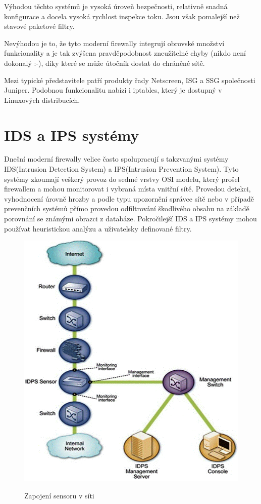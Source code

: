\documentclass[11pt,twoside,a4paper]{article}
\begin{document}
Výhodou těchto systémů je vysoká úroveň bezpečnosti, relativně snadná konfigurace a docela vysoká rychlost inspekce toku. Jsou však pomalejší než stavové paketové filtry.

Nevýhodou je to, že tyto moderní firewally integrují obrovské množství funkcionality a je tak zvýšena pravděpodobnost zneužitelné chyby (nikdo není dokonalý :-), díky které se může útočník dostat do chráněné sítě.

Mezi typické představitele patří produkty řady Netscreen, ISG a SSG společnosti Juniper. Podobnou funkcionalitu nabízi i iptables, který je dostupný v Linuxových distribucích. 

\section{IDS a IPS systémy}
Dnešní moderní firewally velice často spolupracují s takzvanými systémy IDS(Intrusion Detection System) a IPS(Intrusion Prevention System). Tyto systémy zkoumají veškerý provoz do sedmé vrstvy OSI modelu, který prošel firewallem a mohou monitorovat i vybraná místa vnitřní sítě. Provedou detekci, vyhodnocení úrovně hrozby a podle typu upozornění správce sítě nebo v případě prevenčních systémů přímo provedou odfiltrování škodlivého obsahu na základě porovnání se známými obrazci z databáze. Pokročilejší IDS a IPS systémy mohou používat heuristickou analýzu a uživatelsky definované filtry. 

\begin{figure}
	\includegraphics[scale=0.4]{./pict/idps.png}
	\label{pic:idps_sen}
	\caption{Zapojení sensoru v síti \cite{ref:idps}}
\end{figure}
\end{document}

